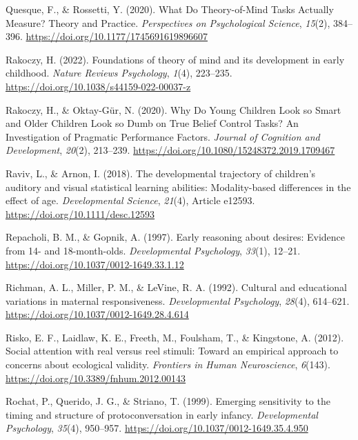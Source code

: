 \documentclass[
]{scrbook}
\newlength{\cslhangindent}
\newenvironment{CSLReferences}[2] %
 {\begin{list}{}{%
  \setlength{\itemindent}{0pt}
  \setlength{\leftmargin}{0pt}
  \setlength{\parsep}{0pt}
  \ifodd #1
   \setlength{\leftmargin}{\cslhangindent}
   \setlength{\itemindent}{-1\cslhangindent}
  \fi
  \setlength{\itemsep}{#2\baselineskip}}}
 {\end{list}}
\begin{document}
\begin{CSLReferences}{1}{0}
Quesque, F., \& Rossetti, Y. (2020). What {Do Theory-of-Mind Tasks Actually Measure}? {Theory} and {Practice}. \emph{Perspectives on Psychological Science}, \emph{15}(2), 384--396. \url{https://doi.org/10.1177/1745691619896607}

Rakoczy, H. (2022). Foundations of theory of mind and its development in early childhood. \emph{Nature Reviews Psychology}, \emph{1}(4), 223--235. \url{https://doi.org/10.1038/s44159-022-00037-z}

Rakoczy, H., \& Oktay-Gür, N. (2020). Why {Do Young Children Look} so {Smart} and {Older Children Look} so {Dumb} on {True Belief Control Tasks}? {An Investigation} of {Pragmatic Performance Factors}. \emph{Journal of Cognition and Development}, \emph{20}(2), 213--239. \url{https://doi.org/10.1080/15248372.2019.1709467}

Raviv, L., \& Arnon, I. (2018). The developmental trajectory of children's auditory and visual statistical learning abilities: Modality-based differences in the effect of age. \emph{Developmental Science}, \emph{21}(4), Article e12593. \url{https://doi.org/10.1111/desc.12593}

Repacholi, B. M., \& Gopnik, A. (1997). Early reasoning about desires: {Evidence} from 14- and 18-month-olds. \emph{Developmental Psychology}, \emph{33}(1), 12--21. \url{https://doi.org/10.1037/0012-1649.33.1.12}

Richman, A. L., Miller, P. M., \& LeVine, R. A. (1992). Cultural and educational variations in maternal responsiveness. \emph{Developmental Psychology}, \emph{28}(4), 614--621. \url{https://doi.org/10.1037/0012-1649.28.4.614}

Risko, E. F., Laidlaw, K. E., Freeth, M., Foulsham, T., \& Kingstone, A. (2012). Social attention with real versus reel stimuli: Toward an empirical approach to concerns about ecological validity. \emph{Frontiers in Human Neuroscience}, \emph{6}(143). \url{https://doi.org/10.3389/fnhum.2012.00143}

Rochat, P., Querido, J. G., \& Striano, T. (1999). Emerging sensitivity to the timing and structure of protoconversation in early infancy. \emph{Developmental Psychology}, \emph{35}(4), 950--957. \url{https://doi.org/10.1037/0012-1649.35.4.950}


\end{CSLReferences}
\end{document}
